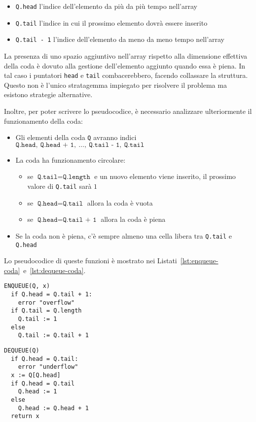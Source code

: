 \documentclass[italian, 10pt]{article}
\begin{document}
\begin{itemize}
  \item \texttt{Q.head} l'indice dell'elemento da più da più tempo nell'array
  \item \texttt{Q.tail} l'indice in cui il prossimo elemento dovrà essere inserito
  \item \texttt{Q.tail - 1} l'indice dell'elemento da meno da meno tempo nell'array
\end{itemize}

La presenza di uno spazio aggiuntivo nell'array rispetto alla dimensione effettiva della coda è dovuto alla gestione dell'elemento aggiunto quando essa è piena.
In tal caso i puntatori \texttt{head} e \texttt{tail} combacerebbero, facendo collassare la struttura.
Questo non è l'unico stratagemma impiegato per risolvere il problema ma esistono strategie alternative.

\bigskip
Inoltre, per poter scrivere lo pseudocodice, è necessario analizzare ulteriormente il funzionamento della coda:

\begin{itemize}
  \item Gli elementi della coda \texttt{Q} avranno indici \(\texttt{Q.head},\ \texttt{Q.head + 1},\ \ldots,\ \texttt{Q.tail - 1},\ \texttt{Q.tail}\)
  \item La coda ha funzionamento circolare:
        \begin{itemize}
          \item se \(\texttt{Q.tail} = \texttt{Q.length}\) e un nuovo elemento viene inserito, il prossimo valore di \texttt{Q.tail} sarà \(1\)
          \item se \(\texttt{Q.head} = \texttt{Q.tail}\) allora la coda è vuota
          \item se \(\texttt{Q.head} = \texttt{Q.tail + 1}\) allora la coda è piena
        \end{itemize}
  \item Se la coda non è piena, c'è sempre almeno una cella libera tra \texttt{Q.tail} e \texttt{Q.head}
\end{itemize}

\bigskip
Lo pseudocodice di queste funzioni è mostrato nei Listati~\ref{lst:enqueue-coda}~e~\ref{lst:dequeue-coda}.

\begin{minipage}[t]{0.495\textwidth}
  \begin{lstlisting}[style=pseudocode, caption={\texttt{ENQUEUE} in coda}, label={lst:enqueue-coda}]
ENQUEUE(Q, x)
  if Q.head = Q.tail + 1:
    error "overflow"
  if Q.tail = Q.length
    Q.tail := 1
  else
    Q.tail := Q.tail + 1
  \end{lstlisting}
\end{minipage}
\begin{minipage}[t]{0.495\textwidth}
  \begin{lstlisting}[style=pseudocode, caption={\texttt{DEQUEUE} in coda}, label={lst:dequeue-coda}]
DEQUEUE(Q)
  if Q.head = Q.tail:
    error "underflow"
  x := Q[Q.head]
  if Q.head = Q.tail
    Q.head := 1
  else
    Q.head := Q.head + 1
  return x
  \end{lstlisting}
\end{minipage}
\end{document}
